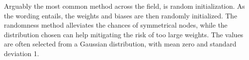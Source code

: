 Arguably the most common method across the field, is random initialization. As the wording entails, the weights and biases are then randomly initialized. The randomness method alleviates the chances of symmetrical nodes, while the distribution chosen can help mitigating the risk of too large weights. The values are often selected from a Gaussian distribution, with mean zero and standard deviation 1. 



